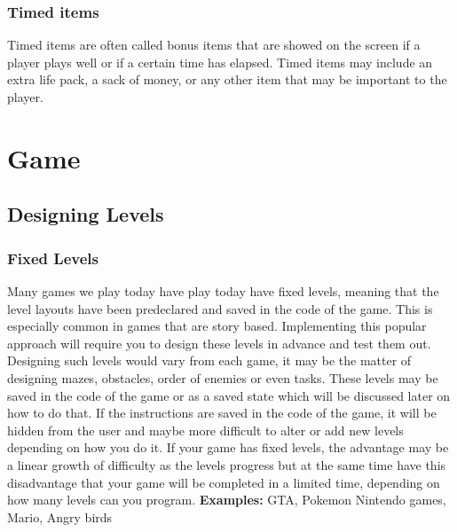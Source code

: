 \documentclass[11pt,fleqn]{book} %
\begin{document}
    \section{Timed items} %
    Timed items are often called bonus items that are showed on the screen if a player plays well or if a certain time has elapsed. 
    Timed items may include an extra life pack, a sack of money, or any other item that may be important to the player. 
    
 


\part{Game}
\chapter{Designing Levels} %
\section{Fixed Levels}
Many games we play today have play today have fixed levels, meaning that the level layouts have been predeclared and saved in the code of the game. This is especially common in games that are story based. Implementing this popular approach will require you to design these levels in advance and test them out. Designing such levels would vary from each game, it may be the matter of designing mazes, obstacles, order of enemies or even tasks. \newline
These levels may be saved in the code of the game or as a saved state which will be discussed later on how to do that. If the instructions are saved in the code of the game, it will be hidden from the user and maybe more difficult to alter or add new levels depending on how you do it. \newline
If your game has fixed levels, the advantage may be a linear growth of difficulty as the levels progress but at the same time have this disadvantage that your game will be completed in a limited time, depending on how many levels can you program.
\newline
\newline
\textbf{Examples:} GTA, Pokemon Nintendo games, Mario, Angry birds
\end{document}
